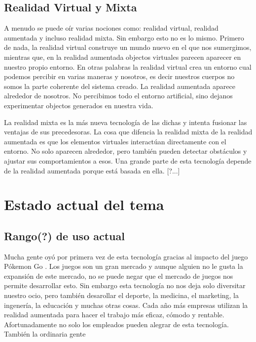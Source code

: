 \documentclass[a4paper,11pt]{scrartcl}
\begin{document}
\subsection{Realidad Virtual y Mixta}
A menudo se puede oír varias nociones como: realidad virtual, realidad aumentada y incluso realidad mixta. Sin embargo esto no es lo mismo. Primero de nada, la realidad virtual construye un mundo nuevo en el que nos sumergimos, mientras que, en la realidad aumentada objectos virtuales parecen aparecer en nuestro propio entorno. En otras palabras la realidad virtual crea un entorno cual podemos percibir en varias maneras y nosotros, es decir nuestros cuerpos no somos la parte coherente del sistema creado. La realidad aumentada aparece alrededor de nosotros. No percibimos todo el entorno artificial, sino dejanos experimentar objectos generados en nuestra vida.
\par La realidad mixta es la más nueva tecnología de las dichas y intenta fusionar las ventajas de sus precedesoras. La cosa que difencia la realidad mixta de la realidad aumentada es que los elementos virtuales interactúan directamente con el entorno. No solo aparecen alrededor, pero también pueden detectar obstáculos y ajustar sus comportamientos a esos. Una grande parte de esta tecnología depende de la realidad aumentada porque está basada en ella. [?...] 

\section{Estado actual del tema}
\subsection{Rango(?) de uso actual}
Mucha gente oyó por primera vez de esta tecnología gracias al impacto del juego Pókemon Go \cite{pokemongo}. Los juegos son un gran mercado y aunque alguien no le gusta la expansión de este mercado, no se puede negar que el mercado de juegos nos permite desarrollar esto. Sin embargo esta tecnología no nos deja solo diversitar nuestro ocio, pero también desarollar el deporte, la medicina, el marketing, la ingenería, la educación y muchas otras cosas. Cada año más empresas utilizan la realidad aumentada para hacer el trabajo más eficaz, cómodo y rentable. Afortunadamente no solo los empleados pueden alegrar de esta tecnología. También la ordinaria gente
\end{document}
